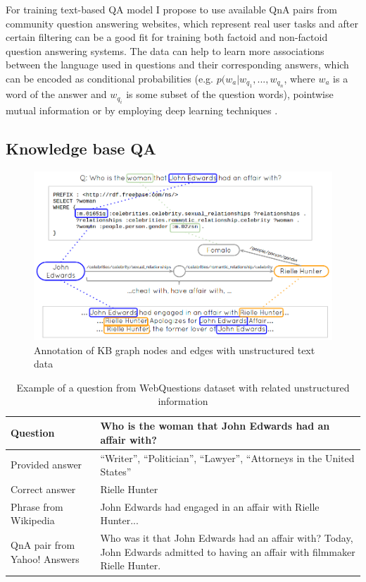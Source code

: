 For training text-based QA model I propose to use available QnA pairs from community question answering websites, which represent real user tasks and after certain filtering can be a good fit for training both factoid and non-factoid question answering systems.
The data can help to learn more associations between the language used in questions and their corresponding answers, which can be encoded as conditional probabilities (e.g. $p(w_a|w_{q_1},...,w_{q_n}$, where $w_a$ is a word of the answer and $w_{q_i}$ is some subset of the question words), pointwise mutual information or by employing deep learning techniques \cite{WangN15}.

\subsection{Knowledge base QA}

\begin{figure}
\centering
\includegraphics[width=1.0\textwidth]{figures/kb_text}
\caption{Annotation of KB graph nodes and edges with unstructured text data}
\label{fig:kb_text}
\end{figure}

\begin{table}
\centering
\caption{Example of a question from WebQuestions dataset with related unstructured information}
\begin{tabular}{| p{5cm} | p{11cm} |} \hline
Question & Who is the woman that John Edwards had an affair with?\\
\hline
Provided answer & ``Writer'', ``Politician'', ``Lawyer'', ``Attorneys in the United States''\\
\hline
Correct answer & Rielle Hunter\\
\hline
Phrase from Wikipedia & John Edwards had engaged in an affair with Rielle Hunter...\\
\hline
QnA pair from Yahoo! Answers & Who was it that John Edwards had an affair with? Today, John Edwards admitted to having an affair with filmmaker Rielle Hunter.\\
\hline
\end{tabular}
\label{table:kbqa_example}
\end{table}

